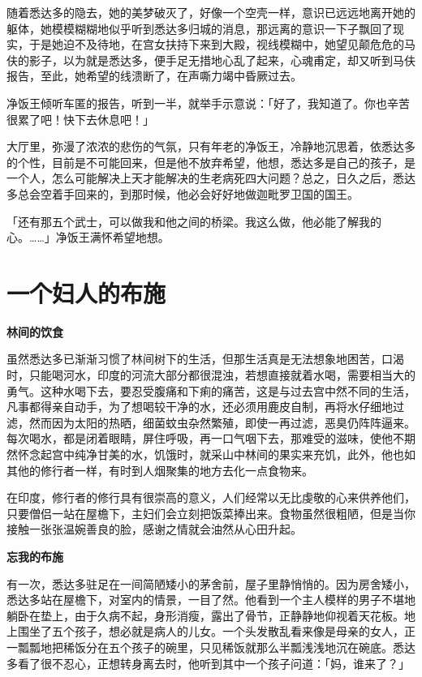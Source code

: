 \documentclass[12pt,twoside,openany]{book}
\newcommand{\mt}[1]{\textbullet \textbf{#1}}
\begin{document}
随着悉达多的隐去，她的美梦破灭了，好像一个空壳一样，意识已远远地离开她的躯体，她模模糊糊地似乎听到悉达多归城的消息，那远离的意识一下子飘回了现实，于是她迫不及待地，在宫女扶持下来到大殿，视线模糊中，她望见颠危危的马伕的影子，以为就是悉达多，便手足无措地心乱了起来，心魂甫定，却又听到马伕报告，至此，她希望的线溃断了，在声嘶力竭中昏厥过去。

净饭王倾听车匿的报告，听到一半，就举手示意说：「好了，我知道了。你也辛苦很累了吧！快下去休息吧！」

大厅里，弥漫了浓浓的悲伤的气氛，只有年老的净饭王，冷静地沉思着，依悉达多的个性，目前是不可能回来，但是他不放弃希望，他想，悉达多是自己的孩子，是一个人，怎么可能解决上天才能解决的生老病死四大问题？总之，日久之后，悉达多总会空着手回来的，到那时候，他必会好好地做迦毗罗卫国的国王。

「还有那五个武士，可以做我和他之间的桥梁。我这么做，他必能了解我的心。……」净饭王满怀希望地想。

\section{一个妇人的布施}\label{sec1.5}

\mt{林间的饮食}

虽然悉达多已渐渐习惯了林间树下的生活，但那生活真是无法想象地困苦，口渴时，只能喝河水，印度的河流大部分都很混浊，若想直接就着水喝，需要相当大的勇气。这种水喝下去，要忍受腹痛和下痢的痛苦，这是与过去宫中然不同的生活，凡事都得亲自动手，为了想喝较干净的水，还必须用鹿皮自制，再将水仔细地过滤，然而因为太阳的热晒，细菌蚊虫杂然繁殖，即使一再过滤，恶臭仍阵阵逼来。每次喝水，都是闭着眼睛，屏住呼吸，再一口气咽下去，那难受的滋味，使他不期然怀念起宫中纯净甘美的水，饥饿时，就采山中林间的果实来充饥，此外，他也如其他的修行者一样，有时到人烟聚集的地方去化一点食物来。

在印度，修行者的修行具有很崇高的意义，人们经常以无比虔敬的心来供养他们，只要僧侣一站在屋檐下，主妇们会立刻把饭菜捧出来。食物虽然很粗陋，但是当你接触一张张温婉善良的脸，感谢之情就会油然从心田升起。

\mt{忘我的布施}

有一次，悉达多驻足在一间简陋矮小的茅舍前，屋子里静悄悄的。因为房舍矮小，悉达多站在屋檐下，对室内的情景，一目了然。他看到一个主人模样的男子不堪地躺卧在垫上，由于久病不起，身形消瘦，露出了骨节，正静静地仰视着天花板。地上围坐了五个孩子，想必就是病人的儿女。一个头发散乱看来像是母亲的女人，正一瓢瓢地把稀饭分在五个孩子的碗里，只见稀饭就那么半瓢浅浅地沉在碗底。悉达多看了很不忍心，正想转身离去时，他听到其中一个孩子问道：「妈，谁来了？」
\end{document}
